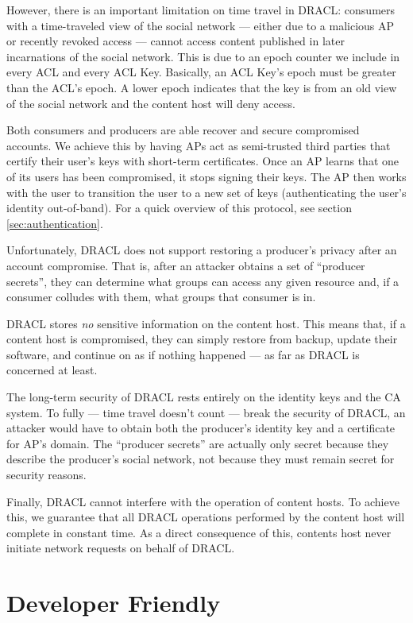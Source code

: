 \documentclass[pdftex,12pt,a4papaer,twoside,notitlepage]{report}
\begin{document}
However, there is an important limitation on time travel in DRACL: consumers
with a time-traveled view of the social network --- either due to a malicious AP
or recently revoked access --- cannot access content published in later
incarnations of the social network. This is due to an epoch counter we include
in every ACL and every ACL Key. Basically, an ACL Key's epoch must be greater
than the ACL's epoch. A lower epoch indicates that the key is from an old view
of the social network and the content host will deny access.

Both consumers and producers are able recover and secure compromised accounts.
We achieve this by having APs act as semi-trusted third parties that certify
their user's keys with short-term certificates. Once an AP learns that one of
its users has been compromised, it stops signing their keys. The AP then works
with the user to transition the user to a new set of keys (authenticating the
user's identity out-of-band). For a quick overview of this protocol, see section
\cref{sec:authentication}.

\label{par:restore-privacy}
Unfortunately, DRACL does not support restoring a producer's privacy after an
account compromise. That is, after an attacker obtains a set of ``producer
secrets'', they can determine what groups can access any given resource and, if
a consumer colludes with them, what groups that consumer is in.

DRACL stores \emph{no} sensitive information on the content host. This means
that, if a content host is compromised, they can simply restore from backup,
update their software, and continue on as if nothing happened --- as far as
DRACL is concerned at least.

The long-term security of DRACL rests entirely on the identity keys and the CA
system. To fully --- time travel doesn't count --- break the security of DRACL,
an attacker would have to obtain both the producer's identity key and a
certificate for AP's domain. The ``producer secrets'' are actually only secret
because they describe the producer's social network, not because they must
remain secret for security reasons.

Finally, DRACL cannot interfere with the operation of content hosts. To achieve
this, we guarantee that all DRACL operations performed by the content host will
complete in constant time. As a direct consequence of this, contents host never
initiate network requests on behalf of DRACL\@.

\section{Developer Friendly}
\end{document}
